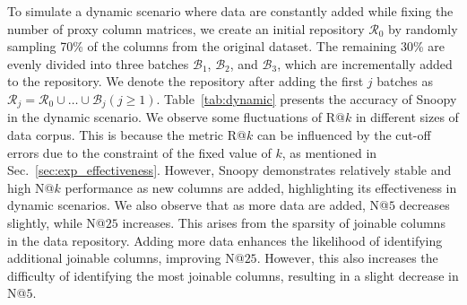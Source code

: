 \begin{table}[t]
\small
\centering
\caption{ Performance of different cell sampling strategies applied to DeepJoin. The best results are in bold.} 
\label{tab:tfidf}
\vspace{-2mm}
\renewcommand{\arraystretch}{1.2} %
\label{tab:ablation}
\vspace{-3mm}
\end{table} 


 To simulate a dynamic scenario where data are constantly added while fixing the number of proxy column matrices, we create an initial repository $\mathcal{R}_0$ by randomly sampling 70\% of the columns from the original dataset.
The remaining 30\%  are evenly divided into three batches $\mathcal{B}_1$, $\mathcal{B}_2$, and $\mathcal{B}_3$, which are incrementally added to the repository.
We denote the repository after adding the first $j$ batches as  $\mathcal{R}_j = \mathcal{R}_0 \cup \dots \cup \mathcal{B}_j (j \geq 1)$.
Table~\ref{tab:dynamic} presents the accuracy of \textsf{Snoopy} in the dynamic scenario. 
We observe some fluctuations of  R@$k$ in different sizes of data corpus. This is because the metric R@$k$ can be influenced by the cut-off errors due to the constraint of the fixed value of $k$, as mentioned in Sec.~\ref{sec:exp_effectiveness}. However, \textsf{Snoopy} demonstrates relatively stable and high N@$k$ performance as new columns are added, highlighting its effectiveness in dynamic scenarios. We also observe that as more data are added, N@$5$ decreases slightly, while N@$25$ increases. 
This arises from the sparsity of joinable columns in the data repository. Adding more data enhances the likelihood of identifying additional joinable columns, improving N@$25$. However, this also increases the difficulty of identifying the most joinable columns, resulting in a slight decrease in N@$5$. 
 



